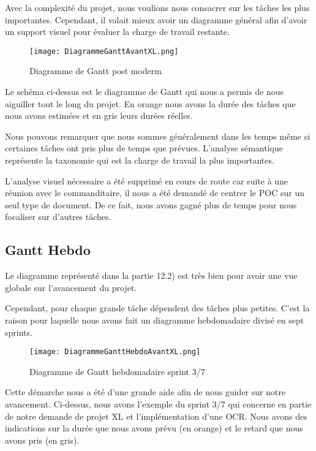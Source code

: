 Avec la complexité du projet, nous voulions nous consacrer sur les tâches les plus importantes.
Cependant, il valait mieux avoir un diagramme général afin d'avoir un support visuel pour évaluer la charge de travail restante. 

\begin{figure}[h!]
  \texttt{[image: DiagrammeGanttAvantXL.png]}
	\caption{Diagramme de Gantt post moderm}
	\label{}
\end{figure}

Le schéma ci-dessus est le diagramme de Gantt qui nous a permis de nous aiguiller tout le long du projet.
En orange nous avons la durée des tâches que nous avons estimées et en gris leurs durées réelles.

Nous pouvons remarquer que nous sommes généralement dans les temps même si certaines tâches ont pris plus de temps que prévues.
L'analyse sémantique représente la taxonomie qui est la charge de travail la plus importantes. 

L'analyse visuel nécessaire a été supprimé en cours de route car suite à une réunion avec le commanditaire, il nous a été demandé de centrer le POC sur un seul type de document.
De ce fait, nous avons gagné plus de temps pour nous focaliser sur d'autres tâches. 



\subsection{Gantt Hebdo}
Le diagramme représenté dans la partie 12.2) est très bien pour avoir une vue globale sur l'avancement du projet.

Cependant, pour chaque grande tâche dépendent des tâches plus petites. 
C'est la raison pour laquelle nous avons fait un diagramme hebdomadaire divisé en sept sprints. 

\begin{figure}[h!]
  \centering
  \texttt{[image: DiagrammeGanttHebdoAvantXL.png]}
	\caption[]{Diagramme de Gantt hebdomadaire sprint 3/7}
	\label{}
\end{figure}

Cette démarche nous a été d’une grande aide afin de nous guider sur notre avancement.
Ci-dessus, nous avons l'exemple du sprint 3/7 qui concerne en partie de notre demande de projet XL et l’implémentation d'une OCR\@. 
Nous avons des indications sur la durée que nous avons prévu (en orange) et le retard que nous avons pris (en gris). 



